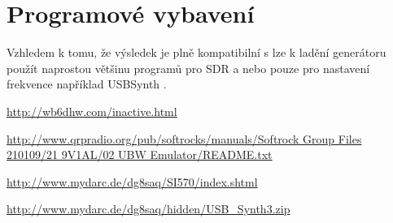 \documentclass[12pt,a4paper,oneside]{article}
\begin{document}
\section{Programové vybavení}
Vzhledem k tomu, že výsledek je plně kompatibilní s  \cite{DG8SAQSynthesizer} lze k ladění generátoru použít naprostou většinu programů pro SDR a nebo pouze pro nastavení frekvence například USBSynth \cite{USB_Synth}.

\begin{thebibliography}{99}
\href{http://wb6dhw.com/inactive.html}{http://wb6dhw.com/inactive.html}

\href{http://www.qrpradio.org/pub/softrocks/manuals/Softrock Group Files 210109/21 9V1AL/02 UBW Emulator/README.txt}{http://www.qrpradio.org/pub/softrocks/manuals/Softrock Group Files 210109/21 9V1AL/02 UBW Emulator/README.txt}

\href{http://www.mydarc.de/dg8saq/SI570/index.shtml}{http://www.mydarc.de/dg8saq/SI570/index.shtml}

\href{ http://www.mydarc.de/dg8saq/hidden/USB\_Synth3.zip}{http://www.mydarc.de/dg8saq/hidden/USB\_Synth3.zip}

\end{thebibliography}
\end{document}
